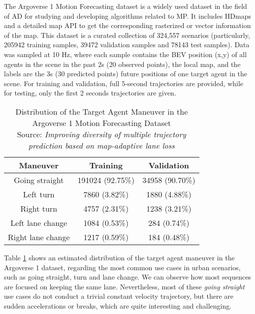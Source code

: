 The Argoverse 1 Motion Forecasting dataset is a widely used dataset in the field of \ac{AD} for studying and developing algorithms related to \ac{MP}. It includes \acp{HDmap} and a detailed map API to get the corresponding rasterized or vector information of the map. This dataset is a curated collection of 324,557 scenarios (particularly, 205942 training samples, 39472 validation samples and 78143 test samples). Data was sampled at 10 Hz, where each sample contains the \ac{BEV} position (x,y) of all agents in the scene in the past 2s (20 observed points), the local map, and the labels are the 3s (30 predicted points) future positions of one target agent in the scene. For training and validation, full 5-second trajectories are provided, while for testing, only the first 2 seconds trajectories are given. 

\begin{table}[!tpbh]
	\centering
	\caption[Distribution of the Target Agent Maneuver in the Argoverse 1 Motion Forecasting Dataset]{Distribution of the Target Agent Maneuver in the Argoverse 1 Motion Forecasting Dataset \\
	Source: \textit{Improving diversity of multiple trajectory prediction based on map-adaptive lane loss} \cite{kim2022improving}}
	\label{table:2_argoverse1_maneuvers_distribution}
	\begin{tabular}{c|c|c}
		\toprule
		Maneuver & Training  & Validation\\
		\midrule
		Going straight & 191024 (92.75\%) & 34958 (90.70\%) \\
		Left turn & 7860 (3.82\%) & 1880 (4.88\%) \\
		Right turn & 4757 (2.31\%) & 1238 (3.21\%) \\
		Left lane change & 1084 (0.53\%) & 284 (0.74\%) \\
		Right lane change & 1217 (0.59\%) & 184 (0.48\%) \\
		\bottomrule
	\end{tabular}
\end{table} 

Table \ref{table:2_argoverse1_maneuvers_distribution} shows an estimated distribution of the target agent maneuver in the Argoverse 1 dataset, regarding the most common use cases in urban scenarios, such as going straight, turn and lane change. We can observe how most sequences are focused on keeping the same lane. Nevertheless, most of these \textit{going straight} use cases do not conduct a trivial constant velocity trajectory, but there are sudden accelerations or breaks, which are quite interesting and challenging.

